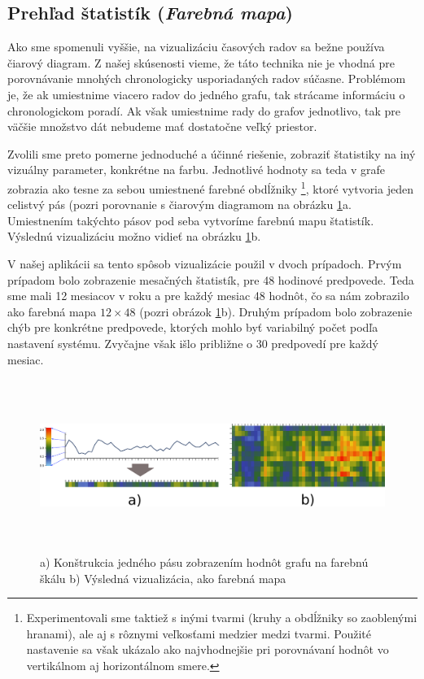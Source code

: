 \subsection{Prehľad štatistík {\small(\textit{Farebná mapa})}}
\label{sec:colormap}
Ako sme spomenuli vyššie, na vizualizáciu časových radov sa bežne používa čiarový diagram. Z našej skúsenosti vieme, že táto technika nie je vhodná pre porovnávanie mnohých chronologicky usporiadaných radov súčasne. Problémom je, že ak umiestnime viacero radov do jedného grafu, tak strácame informáciu o chronologickom poradí. Ak však umiestnime rady do grafov jednotlivo, tak pre väčšie množstvo dát nebudeme mať dostatočne veľký priestor.

Zvolili sme preto pomerne jednoduché a účinné riešenie, zobraziť štatistiky na iný vizuálny parameter, konkrétne na farbu. Jednotlivé hodnoty sa teda v grafe zobrazia ako tesne za sebou umiestnené farebné obdĺžniky \footnote{Experimentovali sme taktiež s inými tvarmi (kruhy a obdĺžniky so zaoblenými hranami), ale aj s rôznymi veľkosťami medzier medzi tvarmi. Použité nastavenie sa však ukázalo ako najvhodnejšie pri porovnávaní hodnôt vo vertikálnom aj horizontálnom smere.}, ktoré vytvoria jeden celistvý pás (pozri porovnanie s čiarovým diagramom na obrázku \ref{fig:colormap}a. Umiestnením takýchto pásov pod seba vytvoríme farebnú mapu štatistík. Výslednú vizualizáciu možno vidieť na obrázku \ref{fig:colormap}b. 

V našej aplikácii sa tento spôsob vizualizácie použil v dvoch prípadoch. Prvým prípadom bolo zobrazenie mesačných štatistík, pre 48 hodinové predpovede. Teda sme mali 12 mesiacov v roku a pre každý mesiac 48 hodnôt, čo sa nám zobrazilo ako farebná mapa $ 12 \times 48 $ (pozri obrázok \ref{fig:colormap}b). Druhým prípadom bolo zobrazenie chýb pre konkrétne predpovede, ktorých mohlo byť variabilný počet podľa nastavení systému. Zvyčajne však išlo približne o 30 predpovedí pre každý mesiac.

\begin{figure}
	\centering
	\hspace*{-0.45in}
	\includegraphics[width = 7.0in, height = 2.2in]{colormap}
	\caption{a) Konštrukcia jedného pásu zobrazením hodnôt grafu na farebnú škálu b) Výsledná vizualizácia, ako farebná mapa }
	\label{fig:colormap}
\end{figure}

